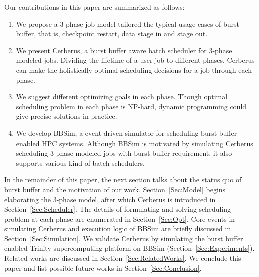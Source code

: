 Our contributions in this paper are summarized as follows:
\begin{enumerate}
        \item %
                We propose a 3-phase job model tailored the typical
                usage cases of burst buffer, that is, checkpoint restart,
                data stage in and stage out.
        \item   We present Cerberus,
                a burst buffer aware batch scheduler for 3-phase modeled jobs.
                Dividing the lifetime of a user job to different phases,
                Cerberus can make the holistically optimal scheduling decisions 
                for a job through each phase.
        \item   We suggest different optimizing goals in each phase.
                Though optimal scheduling problem in each phase is NP-hard,
                dynamic programming could give precise solutions
                in practice.
        \item   We develop BBSim, a event-driven simulator for scheduling
                burst buffer enabled HPC systems.
                Although BBSim is motivated by simulating Cerberus scheduling 
                3-phase modeled jobs with burst buffer requirement,
                it also supports various kind of batch schedulers.
\end{enumerate}


In the remainder of this paper,
the next section talks about the status quo of burst buffer and
the motivation of our work.
Section~\ref{Sec:Model} begins elaborating the 3-phase model,
after which Cerberus is introduced in Section~\ref{Sec:Scheduler}.
The details of formulating and solving scheduling problem
at each phase are enumerated in Section~\ref{Sec:Opt}.
Core events in simulating Cerberus and execution logic of BBSim are
briefly discussed in Section~\ref{Sec:Simulation}.
We validate Cerberus by simulating the burst buffer enabled
Trinity supercomputing platform on BBSim (Section~\ref{Sec:Experiments}).
Related works are discussed in Section~\ref{Sec:RelatedWorks}.
We conclude this paper and list possible future works in Section~\ref{Sec:Conclusion}.


